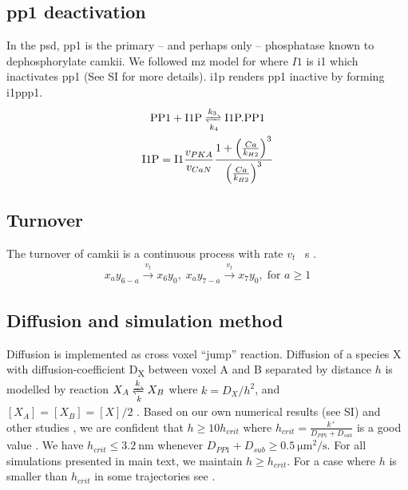 \documentclass[9pt,lineno,doublespacing]{elife}
\newcommand\SUB[2]{#1\textsubscript{#2}}
\begin{document}
{\subsection{\gls{pp1} deactivation}\label{subsec:pp1_deactivation} 
In the \gls{psd}, \gls{pp1} is the primary -- and perhaps only -- phosphatase known to
dephosphorylate \gls{camkii}\citep{strack_translocation_1997}.  We followed
\gls{mz} model for  where $I1$ is \gls{i1} which inactivates
\gls{pp1} (See SI for more details). \Gls{i1p} renders \gls{pp1} inactive by
forming \gls{i1ppp1}. 
\begin{equation}\label{eq:i1pandpp1}
    \begin{gathered}
        \text{PP1} + \text{I1P} \xrightleftharpoons[k_4]{k_3} \text{I1P.PP1} \\
        \text{I1P} = \text{I1} \frac{v_{PKA}}{v_{CaN}} 
            \frac{1+\left(\frac{Ca}{k_{H2}}\right)^3}{\left(\frac{Ca}{k_{H2}}\right)^3}
    \end{gathered}
\end{equation}

\subsection{Turnover}\label{turnover}
The turnover of \gls{camkii} is a continuous process with rate
$v_{t}$ \si{\per\second} .
\begin{equation} \label{eq:turnover}
    \begin{gathered}
        x_ay_{6-a} \xrightarrow{v_t} x_6y_0,\;
        x_ay_{7-a} \xrightarrow{v_t} x_7y_0,\; \text{for } a \ge 1
    \end{gathered}
\end{equation}

\subsection{Diffusion and simulation method}\label{subsec:simulator}
Diffusion is implemented as cross voxel ``jump'' reaction. Diffusion of a
species X with diffusion-coefficient \SUB{D}{X} between voxel A and B separated
by distance $h$ is modelled by reaction $X_A \xrightleftharpoons[k]{k} X_B$
where \( k={D_X}/{h^2}\), and \([X_A]=[X_B]=[X]/2 \)
\citep{erban_practical_2007}.  Based on our own numerical results (see SI) and
other studies \citep{isaacson_reaction-diffusion_2009,erban_stochastic_2009}, we
are confident that \( h \ge 10h_{crit}\) where
\(h_{crit}=\frac{k^+}{D_{PP1}+D_{sub}}\) is a good value
\citep{erban_stochastic_2009}.  We have \( h_{crit} \le \SI{3.2}{\nano\meter} \)
whenever $D_{PP1}+D_{sub}\ge\SI{0.5}{\micro\meter\squared\per\second}$. For all
simulations presented in main text, we maintain $h\ge h_{crit}$.  For a case
where $h$ is smaller than $h_{crit}$ in some trajectories see
. 

}
\end{document}
